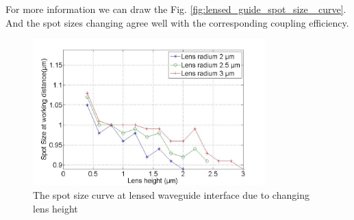 For more information we can draw the Fig. \ref{fig:lensed_guide_spot_size_ curve}. And the spot sizes changing agree well with the corresponding coupling efficiency.
\begin{figure}[!ht]
\includegraphics[width=0.8\textwidth]{bilder/spot_fix_lens_radium_hxx}
\caption{The spot size curve at lensed waveguide interface due to changing lens height}
\label{fig:lensed_guide_spot_size_ curve }
\end{figure}
